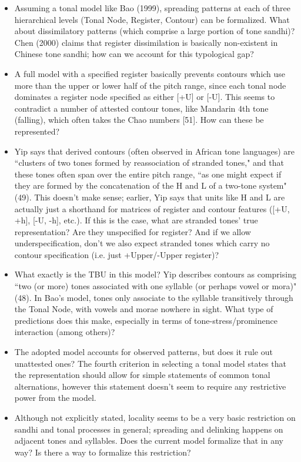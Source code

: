 \documentclass{article}
\begin{document}
\begin{itemize}
	\item Assuming a tonal model like Bao (1999), spreading patterns at each of three hierarchical levels (Tonal Node, Register, Contour) can be formalized. What about dissimilatory patterns (which comprise a large portion of tone sandhi)? Chen (2000) claims that register dissimilation is basically non-existent in Chinese tone sandhi; how can we account for this typological gap?
	\item A full model with a specified register basically prevents contours which use more than the upper or lower half of the pitch range, since each tonal node dominates a register node specified as either [+U] or [-U]. This seems to contradict a number of attested contour tones, like Mandarin 4th tone (falling), which often takes the Chao numbers [51]. How can these be represented?
	\item Yip says that derived contours (often observed in African tone languages) are ``clusters of two tones formed by reassociation of stranded tones," and that these tones often span over the entire pitch range, ``as one might expect if they are formed by the concatenation of the H and L of a two-tone system" (49). This doesn't make sense; earlier, Yip says that units like H and L are actually just a shorthand for matrices of register and contour features ([+U, +h], [-U, -h], etc.). If this is the case, what are stranded tones' true representation? Are they unspecified for register? And if we allow underspecification, don't we also expect stranded tones which carry no contour specification (i.e. just +Upper/-Upper register)?
	\item What exactly is the TBU in this model? Yip describes contours as comprising ``two (or more) tones associated with one syllable (or perhaps vowel or  mora)" (48). In Bao's model, tones only associate to the syllable transitively through the Tonal Node, with vowels and morae nowhere in sight. What type of predictions does this make, especially in terms of tone-stress/prominence interaction (among others)?
	\item The adopted model accounts for observed patterns, but does it rule out unattested ones? The fourth criterion in selecting a tonal model states that the representation should allow for simple statements of common tonal alternations, however this statement doesn't seem to require any restrictive power from the model. 
	\item Although not explicitly stated, locality seems to be a very basic restriction on sandhi and tonal processes in general; spreading and delinking happens on adjacent tones and syllables. Does the current model formalize that in any way? Is there a way to formalize this restriction?
\end{itemize}
\end{document}
